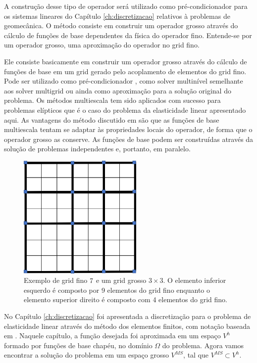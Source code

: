A construção desse tipo de operador será utilizado como pré-condicionador para os  sistemas lineares do Capítulo \ref{ch:discretizacao} relativos à problemas de geomecânica. O método consiste em construir um operador grosso através do cálculo de funções de base dependentes da física do operador fino. Entende-se por um operador grosso, uma aproximação do operador no grid fino.


Ele consiste basicamente em construir um operador grosso através do cálculo de funções de base em um grid gerado pelo acoplamento de elementos do grid fino. Pode ser utilizado como pré-condicionador \cite{casteletto}, como solver multinível semelhante aos solver multigrid ou ainda como aproximação para a solução original do problema. Os métodos multiescala tem sido aplicados com sucesso para problemas elípticos que é o caso do problema da elasticidade linear apresentado aqui. As vantagens do método discutido em \cite{thomashou} são que as funções de base multiescala tentam se adaptar às propriedades locais do operador, de forma que o operador grosso as conserve. As funções de base podem ser construídas através da solução de problemas independentes e, portanto, em paralelo.


\begin{figure}[!htbp]
\centering
\includegraphics[width=6cm]{chap06/figs/grosso.png}
\caption{Exemplo de grid fino $7\time 7$ e um grid grosso $3\times 3$. O elemento inferior esquerdo é composto por 9 elementos do grid fino enquanto o elemento superior direito é composto com 4 elementos do grid fino.}
\label{fig:gridgrosso}

\end{figure}


No Capítulo \ref{ch:discretizacao} foi apresentada a discretização  para o problema de elasticidade linear através do método dos elementos finitos, com notação baseada em \cite{mbuck}. Naquele capítulo, a função desejada foi aproximada em um espaço $V^h$ formado por funções de base chapéu, no domínio $\Omega$ do problema. Agora vamos encontrar a solução do problema em um espaço grosso $V^{MS}$, tal que $V^{MS} \subset V^h$.



